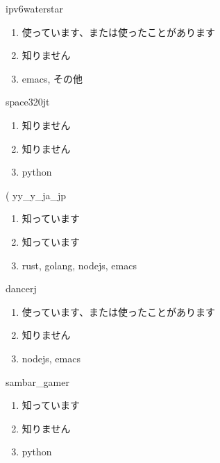 \begin{prework}{ ipv6waterstar }
  \begin{enumerate}
  \item 使っています、または使ったことがあります
  \item 知りません
  \item emacs, その他
  \end{enumerate}
\end{prework}

\begin{prework}{ space320jt }
  \begin{enumerate}
  \item 知りません
  \item 知りません
  \item python
  \end{enumerate}
\end{prework}

\begin{prework}{( yy\_y\_ja\_jp }
  \begin{enumerate}
  \item 知っています
  \item 知っています
  \item rust, golang, nodejs, emacs
  \end{enumerate}
\end{prework}

\begin{prework}{ dancerj }
  \begin{enumerate}
  \item 使っています、または使ったことがあります
  \item 知りません
  \item nodejs, emacs
  \end{enumerate}
\end{prework}

\begin{prework}{ sambar\_gamer }
  \begin{enumerate}
  \item 知っています
  \item 知りません
  \item python
  \end{enumerate}
\end{prework}
